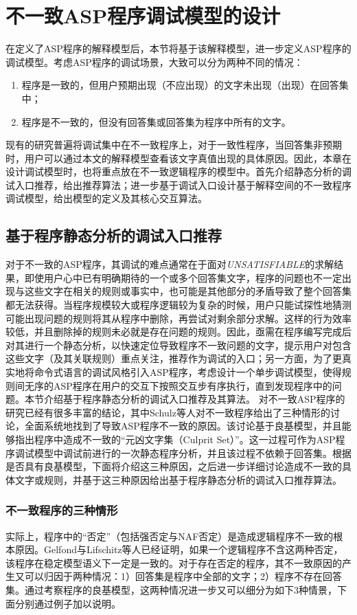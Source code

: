 \chapter{不一致ASP程序调试模型的设计}
\label{chp:debug}
在定义了ASP程序的解释模型后，本节将基于该解释模型，进一步定义ASP程序的调试模型。考虑ASP程序的调试场景，大致可以分为两种不同的情况：
\begin{enumerate}[topsep=0pt]
    \setlength\itemsep{-0.3em}
    \item 程序是一致的，但用户预期出现（不应出现）的文字未出现（出现）在回答集中；
    \item 程序是不一致的，但没有回答集或回答集为程序中所有的文字\cite{schulz2015characterising}。
\end{enumerate}

现有的研究普遍将调试集中在不一致程序上，对于一致性程序，当回答集非预期时，用户可以通过本文的解释模型查看该文字真值出现的具体原因。因此，本章在设计调试模型时，也将重点放在不一致逻辑程序的模型中。首先介绍静态分析的调试入口推荐，给出推荐算法；进一步基于调试入口设计基于解释空间的不一致程序调试模型，给出模型的定义及其核心交互算法。
\section{基于程序静态分析的调试入口推荐}
对于不一致的ASP程序，其调试的难点通常在于面对\textit{UNSATISFIABLE}的求解结果，即使用户心中已有明确期待的一个或多个回答集文字，程序的问题也不一定出现与这些文字在相关的规则或事实中，也可能是其他部分的矛盾导致了整个回答集都无法获得。当程序规模较大或程序逻辑较为复杂的时候，用户只能试探性地猜测可能出现问题的规则将其从程序中删除，再尝试对剩余部分求解。这样的行为效率较低，并且删除掉的规则未必就是存在问题的规则。因此，亟需在程序编写完成后对其进行一个静态分析，以快速定位导致程序不一致问题的文字，提示用户对包含这些文字（及其关联规则）重点关注，推荐作为调试的入口；另一方面，为了更真实地将命令式语言的调试风格引入ASP程序，考虑设计一个单步调试模型，使得规则间无序的ASP程序在用户的交互下按照交互步有序执行，直到发现程序中的问题。本节介绍基于程序静态分析的调试入口推荐及其算法。
对不一致ASP程序的研究已经有很多丰富的结论，其中Schulz等人对不一致程序给出了三种情形的讨论\cite{schulz2015characterising}，全面系统地找到了导致ASP程序不一致的原因。该讨论基于良基模型，并且能够指出程序中造成不一致的“元凶文字集（Culprit Set）”。这一过程可作为ASP程序调试模型中调试前进行的一次静态程序分析，并且该过程不依赖于回答集。根据是否具有良基模型，下面将介绍这三种原因，之后进一步详细讨论造成不一致的具体文字或规则，并基于这三种原因给出基于程序静态分析的调试入口推荐算法。
\subsection{不一致程序的三种情形}
实际上，程序中的“否定”（包括强否定与NAF否定）是造成逻辑程序不一致的根本原因。Gelfond与Lifschitz等人已经证明，如果一个逻辑程序不含这两种否定，该程序在稳定模型语义下一定是一致的\cite{gel91b}。对于存在否定的程序，其不一致原因的产生又可以归因于两种情况：1）回答集是程序中全部的文字；2）程序不存在回答集。通过考察程序的良基模型，这两种情况进一步又可以细分为如下3种情景，下面分别通过例子加以说明。

